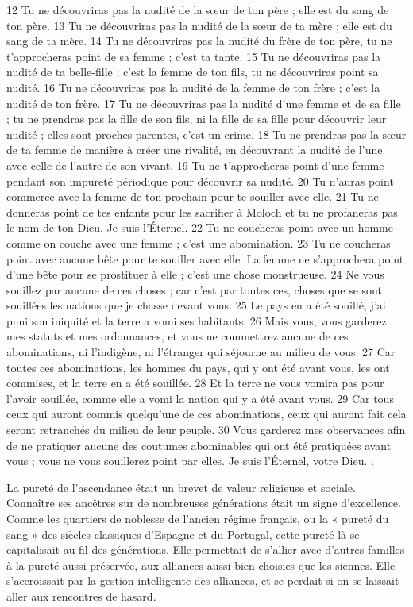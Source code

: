 {{12 Tu ne découvriras pas la nudité de la sœur de ton père ; elle est du sang de ton père.
13 Tu ne découvriras pas la nudité de la sœur de ta mère ; elle est du sang de ta mère.
14 Tu ne découvriras pas la nudité du frère de ton père, tu ne t'approcheras point de sa femme ; c'est ta tante.
15 Tu ne découvriras pas la nudité de ta belle-fille ; c'est la femme de ton fils, tu ne découvriras point sa nudité.
16 Tu ne découvriras pas la nudité de la femme de ton frère ; c'est la nudité de ton frère.
17 Tu ne découvriras pas la nudité d'une femme et de sa fille ; tu ne prendras pas la fille de son fils, ni la fille de sa fille pour découvrir leur nudité ; elles sont proches parentes, c'est un crime.
18 Tu ne prendras pas la sœur de ta femme de manière à créer une rivalité, en découvrant la nudité de l'une avec celle de l'autre de son vivant.
19 Tu ne t'approcheras point d'une femme pendant son impureté périodique pour découvrir sa nudité.
20 Tu n'auras point commerce avec la femme de ton prochain pour te souiller avec elle.
21 Tu ne donneras point de tes enfants pour les sacrifier à Moloch et tu ne profaneras pas le nom de ton Dieu. Je suis l'Éternel.
22 Tu ne coucheras point avec un homme comme on couche avec une femme ; c'est une abomination.
23 Tu ne coucheras point avec aucune bête pour te souiller avec elle. La femme ne s'approchera point d'une bête pour se prostituer à elle ; c'est une chose monstrueuse.
24 Ne vous souillez par aucune de ces choses ; car c'est par toutes ces, choses que se sont souillées les nations que je chasse devant vous.
25 Le pays en a été souillé, j'ai puni son iniquité et la terre a vomi ses habitants.
26 Mais vous, vous garderez mes statuts et mes ordonnances, et vous ne commettrez aucune de ces abominations, ni l'indigène, ni l'étranger qui séjourne au milieu de vous.
27 Car toutes ces abominations, les hommes du pays, qui y ont été avant vous, les ont commises, et la terre en a été souillée.
28 Et la terre ne vous vomira pas pour l'avoir souillée, comme elle a vomi la nation qui y a été avant vous.
29 Car tous ceux qui auront commis quelqu'une de ces abominations, ceux qui auront fait cela seront retranchés du milieu de leur peuple.
30 Vous garderez mes observances afin de ne pratiquer aucune des coutumes abominables qui ont été pratiquées avant vous ; vous ne vous souillerez point par elles. Je suis l'Éternel, votre Dieu. }}. 



 
 
 La pureté de l'ascendance était un brevet de valeur religieuse et sociale. Connaître ses ancêtres sur de nombreuses générations était un signe d'excellence. Comme les quartiers de noblesse de l'ancien régime français, ou la « pureté du sang » des siècles classiques d'Espagne et du Portugal, cette pureté-là se capitalisait au fil des générations. Elle permettait de s'allier avec d'autres familles à la pureté aussi préservée, aux alliances aussi bien choisies que les siennes. Elle s'accroissait par la gestion intelligente des alliances, et se perdait si on se laissait aller aux rencontres de hasard. 

